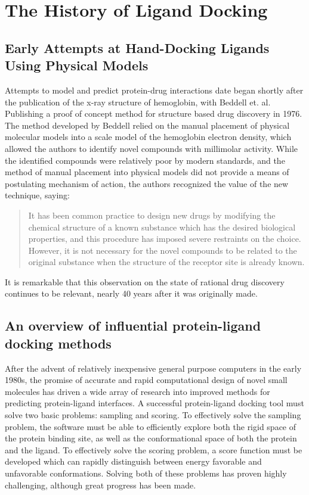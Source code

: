 \section{The History of Ligand Docking}

\subsection{Early Attempts at Hand-Docking Ligands Using Physical Models}
Attempts to model and predict protein-drug interactions date began shortly after the publication of the x-ray structure of hemoglobin, with Beddell et. al. Publishing a proof of concept method for structure based drug discovery in 1976\citep{BEDDELL:1976go}.
The method developed by Beddell relied on the manual placement of physical molecular models into a scale model of the hemoglobin electron density, which allowed the authors to identify novel compounds with millimolar activity. 
While the identified compounds were relatively poor by modern standards, and the method of manual placement into physical models did not provide a means of postulating mechanism of action, the authors recognized the value of the new technique, saying:
\begin{quote}
It has been common practice to design new drugs by modifying the chemical structure of a known substance which has the desired biological properties, and this procedure has imposed severe restraints on the choice.
However, it is not necessary for the novel compounds to be related to the original substance when the structure of the receptor site is already known. 
\end{quote}
It is remarkable that this observation on the state of rational drug discovery continues to be relevant, nearly 40 years after it was originally made. 

\subsection{An overview of influential protein-ligand docking methods}
After the advent of relatively inexpensive general purpose computers in the early 1980s, the promise of accurate and rapid computational design of novel small molecules has driven a wide array of research into improved methods for predicting protein-ligand interfaces.
A successful protein-ligand docking tool must solve two basic problems: sampling and scoring.
To effectively solve the sampling problem, the software must be able to efficiently explore both the rigid space of the protein binding site, as well as the conformational space of both 	the protein and the ligand.
To effectively solve the scoring problem, a score function must be developed which can rapidly distinguish between energy favorable and unfavorable conformations.
Solving both of these problems has proven highly challenging, although great progress has been made. 

